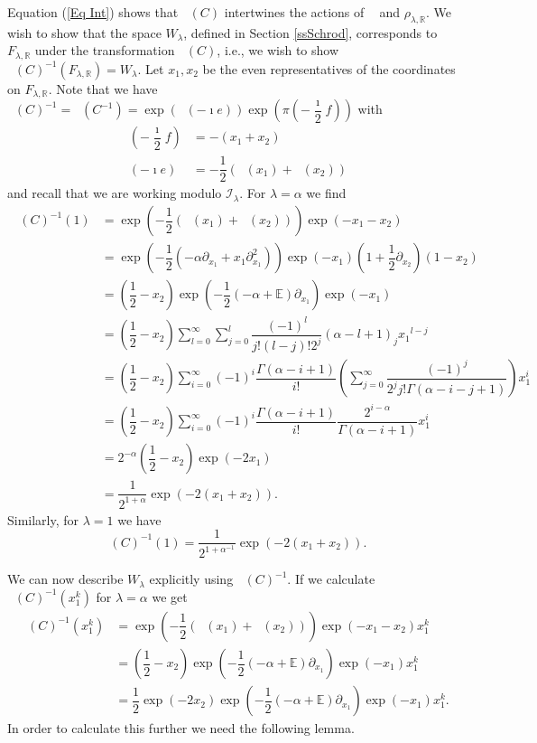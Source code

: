 \documentclass{amsart}
\numberwithin{theorem}{section}
\theoremstyle{definition}
\theoremstyle{remark}
\def\R{\mathds{R} }
\def\E{\mathds{E} }
\DeclareMathOperator{\bessel}{\mathcal B_\lambda}
\newcommand{\iSB}{\pil(C)^{-1}}
\newcommand{\pt}[1]{\partial_{#1}}
\newcommand{\mc}[1]{\mathcal{#1}}
\DeclareMathOperator{\pil}{\pi_\lambda}
\begin{document}
Equation (\ref{Eq Int}) shows that $\pil(C)$ intertwines the actions of $\pil$ and $\rho_{\lambda,\R}$. We wish to show that the space $W_\lambda$, defined in Section \ref{ssSchrod}, corresponds to $F_{\lambda, \R}$ under the transformation $\pil(C)$, i.e., we wish to show $\pil(C)^{-1}(F_{\lambda,\R}) = W_\lambda$. Let $x_1,x_2$ be the even representatives of the coordinates on $F_{\lambda,\R}$. Note that we have $\pil(C)^{-1} = \pil(C^{-1}) = \exp(\pil(-\imath e))\exp(\pi(-\dfrac{\imath}{2}f))$ with
\begin{align*}
\pil(-\dfrac{\imath}{2}f) &= -(x_1+x_2) \\
\pil(-\imath e) &= -\dfrac{1}{2}(\bessel(x_1)+\bessel(x_2))
\end{align*}
and recall that we are working modulo $\mc I_\lambda$. For $\lambda= \alpha$ we find
\begin{align*}
\iSB(1) &= \exp(-\dfrac{1}{2}(\bessel(x_1)+\bessel(x_2)))\exp(-x_1-x_2)\\
&= \exp(-\dfrac{1}{2}(-\alpha \pt {x_1} + x_1 \pt {x_1} ^2))\exp(-x_1)(1+\dfrac{1}{2}\pt {x_2})(1-x_2)\\
&= (\dfrac{1}{2}-x_2)\exp(-\dfrac{1}{2}(-\alpha  + \E)\pt {x_1})\exp(-x_1)\\
&=(\dfrac{1}{2}-x_2)\sum_{l=0}^\infty\sum_{j=0}^l \dfrac{(-1)^{l}}{j!(l-j)!2^j}(\alpha-l+1)_j {x_1}^{l-j}\\
&=(\dfrac{1}{2}-x_2)\sum_{i=0}^\infty (-1)^i \dfrac{\Gamma(\alpha-i+1)}{i!}\left( \sum_{j=0}^\infty \dfrac{(-1)^{j}}{2^{j}j! \Gamma(\alpha-i-j+1)}\right) x_1^{i}\\
&= (\dfrac{1}{2}-x_2)\sum_{i=0}^\infty (-1)^i \dfrac{\Gamma(\alpha-i+1)}{i!}\dfrac{2^{i-\alpha}}{\Gamma(\alpha-i+1)}x_1^i\\
&= 2^{-\alpha}(\dfrac{1}{2}-x_2)\exp(-2x_1)\\
&= \dfrac{1}{2^{1+\alpha}}\exp(-2(x_1+x_2)).
\end{align*}
Similarly, for $\lambda = 1$ we have \[\iSB(1) = \dfrac{1}{2^{1+\alpha^{-1}}}\exp(-2(x_1+x_2)).\]

We can now describe $W_\lambda$ explicitly using $\iSB$. If we calculate $\iSB(x_1^k)$ for $\lambda=\alpha$ we get
\begin{align*}
\iSB(x_1^k) &= \exp(-\dfrac{1}{2}(\bessel(x_1)+\bessel(x_2)))\exp(-x_1-x_2)x_1^k\\
&= (\dfrac{1}{2}-x_2)\exp(-\dfrac{1}{2}(-\alpha  + \E)\pt {x_1})\exp(-x_1)x_1^k\\
&= \dfrac{1}{2}\exp(-2x_2)\exp(-\dfrac{1}{2}(-\alpha  + \E)\pt {x_1})\exp(-x_1)x_1^k.
\end{align*}
In order to calculate this further we need the following lemma.
\end{document}
